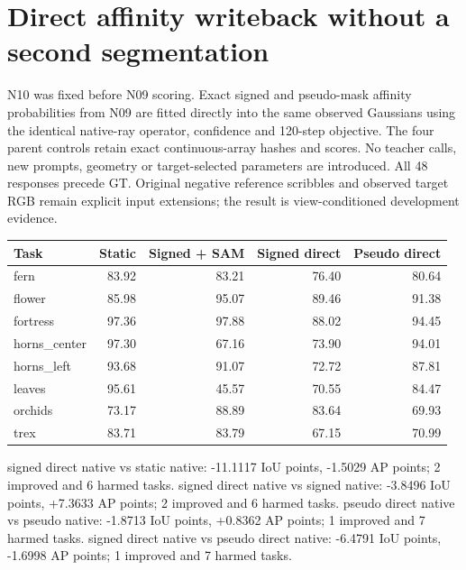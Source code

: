 \section{Direct affinity writeback without a second segmentation}
N10 was fixed before N09 scoring. Exact signed and pseudo-mask affinity probabilities from N09 are fitted directly into the same observed Gaussians using the identical native-ray operator, confidence and 120-step objective. The four parent controls retain exact continuous-array hashes and scores. No teacher calls, new prompts, geometry or target-selected parameters are introduced. All 48 responses precede GT. Original negative reference scribbles and observed target RGB remain explicit input extensions; the result is view-conditioned development evidence.
\begin{center}\small\resizebox{\linewidth}{!}{}\end{center}
\begin{center}\small\begin{tabular}{lrrrr}\toprule
Task & Static & Signed + SAM & Signed direct & Pseudo direct \\\midrule
fern & 83.92 & 83.21 & 76.40 & 80.64 \\
flower & 85.98 & 95.07 & 89.46 & 91.38 \\
fortress & 97.36 & 97.88 & 88.02 & 94.45 \\
horns\_center & 97.30 & 67.16 & 73.90 & 94.01 \\
horns\_left & 93.68 & 91.07 & 72.72 & 87.81 \\
leaves & 95.61 & 45.57 & 70.55 & 84.47 \\
orchids & 73.17 & 88.89 & 83.64 & 69.93 \\
trex & 83.71 & 83.79 & 67.15 & 70.99 \\
\bottomrule\end{tabular}\end{center}
signed direct native vs static native: -11.1117 IoU points, -1.5029 AP points; 2 improved and 6 harmed tasks.
signed direct native vs signed native: -3.8496 IoU points, +7.3633 AP points; 2 improved and 6 harmed tasks.
pseudo direct native vs pseudo native: -1.8713 IoU points, +0.8362 AP points; 1 improved and 7 harmed tasks.
signed direct native vs pseudo direct native: -6.4791 IoU points, -1.6998 AP points; 1 improved and 7 harmed tasks.
